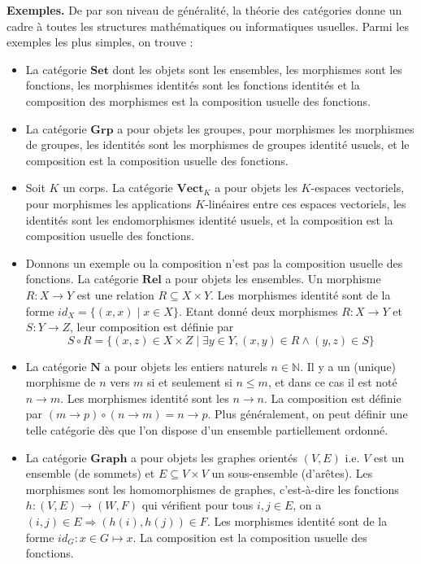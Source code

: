 \documentclass[11pt,a4paper]{report}
\newcommand{\gr}{\textbf}
\newcommand{\1}{\mathbbm{1}}
\begin{document}
\gr{Exemples.} De par son niveau de généralité, la théorie des catégories donne un cadre à toutes les structures mathématiques ou informatiques usuelles. Parmi les exemples les plus simples, on trouve : \begin{itemize}
\setlength\itemsep{-0.3em}
\item La catégorie $\gr{Set}$ dont les objets sont les ensembles, les morphismes sont les fonctions, les morphismes identités sont les fonctions identités et la composition des morphismes est la composition usuelle des fonctions.
\item La catégorie $\gr{Grp}$ a pour objets les groupes, pour morphismes les morphismes de groupes, les identités sont les morphismes de groupes identité usuels, et le composition est la composition usuelle des fonctions.
\item Soit $K$ un corps. La catégorie $\gr{Vect}_{K}$ a pour objets les $K$-espaces vectoriels, pour morphismes les applications $K$-linéaires entre ces espaces vectoriels, les identités sont les endomorphismes identité usuels, et la composition est la composition usuelle des fonctions.
\item Donnons un exemple ou la composition n'est pas la composition usuelle des fonctions. La catégorie $\gr{Rel}$ a pour objets les ensembles. Un morphisme $R : X \to Y$ est une relation $R \subseteq X \times Y$. Les morphismes identité sont de la forme $id_X = \{ (x,x) \mid x \in X \}$. Etant donné deux morphismes $R : X \to Y$ et $S : Y \to Z$, leur composition est définie par
\[ S \circ R = \{ (x,z) \in X \times Z \mid \exists y \in Y, (x,y) \in R \wedge (y,z) \in S\} \]
\item La catégorie $\gr{N}$ a pour objets les entiers naturels $n \in \mathbb{N}$. Il y a un (unique) morphisme de $n$ vers $m$ si et seulement si $n \leq m$, et dans ce cas il est noté $n \to m$. Les morphismes identité sont les $n \to n$. La composition est définie par $(m \to p) \circ (n \to m) = n \to p$. Plus généralement, on peut définir une telle catégorie dès que l'on dispose d'un ensemble partiellement ordonné.
\item La catégorie $\gr{Graph}$ a pour objets les graphes orientés $(V,E)$ i.e. $V$ est un ensemble (de sommets) et $E \subseteq V \times V$ un sous-ensemble (d'arêtes). Les morphismes sont les homomorphismes de graphes, c'est-à-dire les fonctions $h : (V,E) \to (W,F)$ qui vérifient pour tous $i,j \in E$, on a $(i,j) \in E \Rightarrow (h(i),h(j)) \in F$. Les morphismes identité sont de la forme $id_G : x \in G \mapsto x$. La composition est la composition usuelle des fonctions.

\end{itemize}
\end{document}

